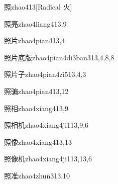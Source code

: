 \begin{verbete}{照}{zhao4}{13}[Radical 火]
\end{verbete}

\begin{verbete}{照亮}{zhao4liang4}{13,9}
\end{verbete}

\begin{verbete}{照片}{zhao4pian4}{13,4}
\end{verbete}

\begin{verbete}{照片底版}{zhao4pian4di3ban3}{13,4,8,8}
\end{verbete}

\begin{verbete}{照片子}{zhao4pian4zi5}{13,4,3}
\end{verbete}

\begin{verbete}{照骗}{zhao4pian4}{13,12}
\end{verbete}

\begin{verbete}{照相}{zhao4xiang4}{13,9}
\end{verbete}

\begin{verbete}{照相机}{zhao4xiang4ji1}{13,9,6}
\end{verbete}

\begin{verbete}{照像}{zhao4xiang4}{13,13}
\end{verbete}

\begin{verbete}{照像机}{zhao4xiang4ji1}{13,13,6}
\end{verbete}

\begin{verbete}{照准}{zhao4zhun3}{13,10}
\end{verbete}

